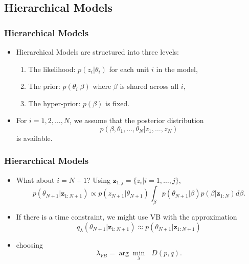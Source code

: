 \documentclass[11pt]{beamer}\usepackage[]{graphicx}\usepackage[]{color}
\begin{document}
\begin{frame}
\subsection{Hierarchical Models}
\frametitle{Hierarchical Models}
\begin{itemize}
\item Hierarchical Models are structured into three levels:
\begin{enumerate}
\item The likelihood: $p(z_i | \theta_i)$ for each unit $i$ in the model,
\item The prior: $p(\theta_i | \beta)$ where $\beta$ is shared across all $i$,
\item The hyper-prior: $p(\beta)$ is fixed.
\end{enumerate}
\pause
\vspace{5mm}
\item For $i = 1, 2, \dots, N$, we assume that the posterior distribution $$p(\beta, \theta_1, \dots, \theta_N | z_1, \dots, z_N)$$ is available.
\end{itemize}
\end{frame}

\begin{frame}
\frametitle{Hierarchical Models}
\begin{itemize}
\item What about $i = N+1$? Using $\textbf{z}_{1:j} = \{z_i | i = 1, \dots, j\}$, $$p(\theta_{N+1} |\textbf{z}_{1:N+1}) \propto p(z_{N+1} | \theta_{N+1})\int_{\beta}p(\theta_{N+1} | \beta)p(\beta | \textbf{z}_{1:N})d\beta.$$
\pause
\item If there is a time constraint, we might use VB with the approximation $$q_{\lambda}(\theta_{N+1} | \textbf{z}_{1:N+1}) \approx p(\theta_{N+1} |\textbf{z}_{1:N+1})$$
\item choosing $$\lambda_{VB} = \arg \underset{\lambda}{\min}\mbox{ }D(p, q).$$
\end{itemize}
\end{frame}
\end{document}
